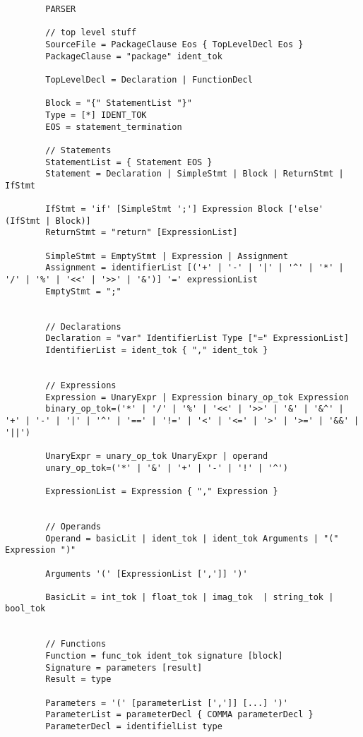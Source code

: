 \documentclass[a4paper,16pt]{article}
\begin{document}
	\begin{verbatim}
		PARSER
		
		// top level stuff
		SourceFile = PackageClause Eos { TopLevelDecl Eos }
		PackageClause = "package" ident_tok
		
		TopLevelDecl = Declaration | FunctionDecl
		
		Block = "{" StatementList "}"
		Type = [*] IDENT_TOK
		EOS = statement_termination
		
		// Statements
		StatementList = { Statement EOS }
		Statement = Declaration | SimpleStmt | Block | ReturnStmt | IfStmt
		
		IfStmt = 'if' [SimpleStmt ';'] Expression Block ['else' (IfStmt | Block)]		
		ReturnStmt = "return" [ExpressionList]
	
		SimpleStmt = EmptyStmt | Expression | Assignment
		Assignment = identifierList [('+' | '-' | '|' | '^' | '*' | '/' | '%' | '<<' | '>>' | '&')] '=' expressionList
		EmptyStmt = ";"
		
		
		// Declarations
		Declaration = "var" IdentifierList Type ["=" ExpressionList]
        IdentifierList = ident_tok { "," ident_tok }
		
		
		// Expressions
		Expression = UnaryExpr | Expression binary_op_tok Expression
		binary_op_tok=('*' | '/' | '%' | '<<' | '>>' | '&' | '&^' | '+' | '-' | '|' | '^' | '==' | '!=' | '<' | '<=' | '>' | '>=' | '&&' | '||')
		
		UnaryExpr = unary_op_tok UnaryExpr | operand
		unary_op_tok=('*' | '&' | '+' | '-' | '!' | '^')
			
		ExpressionList = Expression { "," Expression }
		
	
		// Operands
		Operand = basicLit | ident_tok | ident_tok Arguments | "(" Expression ")"
		
		Arguments '(' [ExpressionList [',']] ')'
		
		BasicLit = int_tok | float_tok | imag_tok  | string_tok | bool_tok
		
		
		// Functions
		Function = func_tok ident_tok signature [block]
		Signature = parameters [result]
		Result = type
		
		Parameters = '(' [parameterList [',']] [...] ')'
		ParameterList = parameterDecl { COMMA parameterDecl }
		ParameterDecl = identifielList type
	\end{verbatim}
\end{document}
